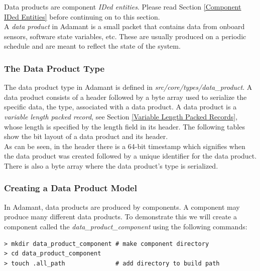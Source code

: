Data products are component \textit{IDed entities}. Please read Section \ref{Component IDed Entities} before continuing on to this section. \\

A \textit{data product} in Adamant is a small packet that contains data from onboard sensors, software state variables, etc. These are usually produced on a periodic schedule and are meant to reflect the state of the system.

\subsubsection{The Data Product Type} \label{The Data Product Type}

The data product type in Adamant is defined in \textit{src/core/types/data\_product}. A data product consists of a header followed by a byte array used to serialize the specific data, the type, associated with a data product. A data product is a \textit{variable length packed record}, see Section \ref{Variable Length Packed Records}, whose length is specified by the length field in its header. The following tables show the bit layout of a data product and its header. \\




As can be seen, in the header there is a 64-bit timestamp which signifies when the data product was created followed by a unique identifier for the data product. There is also a byte array where the data product's type is serialized. \\

\subsubsection{Creating a Data Product Model}

In Adamant, data products are produced by components. A component may produce many different data products. To demonstrate this we will create a component called the \textit{data\_product\_component} using the following commands:

\vspace{5mm} %
\begin{verbatim}
> mkdir data_product_component # make component directory
> cd data_product_component 
> touch .all_path              # add directory to build path
\end{verbatim}
\vspace{5mm} %

